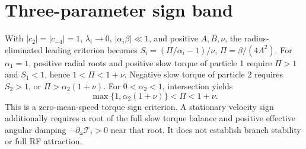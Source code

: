 \section{Three-parameter sign band}
With $|c_2|=|c_{-4}|=1$, $\lambda_i\to0$, $|\alpha_i\beta|\ll1$, and positive $A,B,\nu$, the radius-eliminated leading criterion becomes $S_i=(\Pi/\alpha_i-1)/\nu$, $\Pi=\beta/(4A^2)$. For $\alpha_1=1$, positive radial roots and positive slow torque of particle 1 require $\Pi>1$ and $S_1<1$, hence $1<\Pi<1+\nu$. Negative slow torque of particle 2 requires $S_2>1$, or $\Pi>\alpha_2(1+\nu)$. For $0<\alpha_2<1$, intersection yields
\begin{equation}
\max\{1,\alpha_2(1+\nu)\}<\Pi<1+\nu.
\end{equation}
This is a zero-mean-speed torque sign criterion. A stationary velocity sign additionally requires a root of the full slow torque balance and positive effective angular damping $-\partial_\omega\mathcal T_i>0$ near that root. It does not establish branch stability or full RF attraction.
